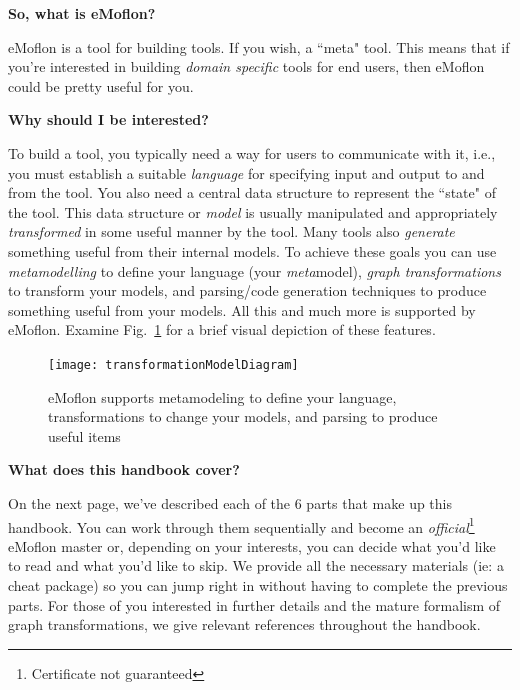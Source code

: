 {\bf \large So, what is eMoflon?}

eMoflon is a tool for building tools. If you wish, a ``meta" tool.  This means that if you're interested in building \emph{domain specific} tools for end users,
then eMoflon could be pretty useful for you.


{\bf \large Why should I be interested?}

To build a tool, you typically need a way for users to communicate with it, i.e., you must establish a suitable \emph{language} for specifying input and output
to and from the tool.  You also need a central data structure to represent the ``state" of the tool.  This data structure or \emph{model} is usually manipulated
and appropriately \emph{transformed} in some useful manner by the tool.  Many tools also \emph{generate} something useful from their internal models. To achieve
these goals you can use \emph{metamodelling} to define your language (your \emph{meta}model), \emph{graph transformations} to transform your models, and
parsing/code generation techniques to produce something useful from your models. All this and much more is supported by eMoflon. Examine
Fig.~\ref{fig:transModel} for a brief visual depiction of these features.

\begin{figure}[htbp]
	\centering
  \texttt{[image: transformationModelDiagram]}
	\caption{eMoflon supports metamodeling to define your language, transformations to change your models, and parsing to produce useful items}
	\label{fig:transModel}
\end{figure}

{\bf \large What does this handbook cover?}

On the next page, we've described each of the 6 parts that make up this handbook. You can work through them sequentially and become an
\emph{official}\footnote{Certificate not guaranteed} eMoflon master or, depending on your interests, you can decide what you'd like to read and what you'd like
to skip. We provide all the necessary materials (ie: a cheat package) so you can jump right in without having to complete the previous parts. For those of you
interested in further details and the mature formalism of graph transformations, we give relevant references throughout the handbook.

\vfill \pagebreak

